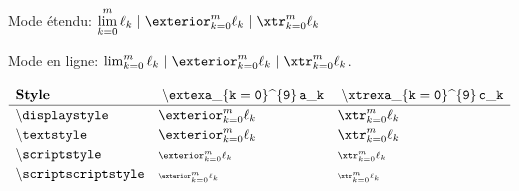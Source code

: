 \documentclass[varwidth, border = 8pt]{standalone}
\newcommand\exasep{\kern3pt | \kern3pt}
\newcommand\limexa{\lim_{k = 0}^{m} \ell_k}
\newcommand\xtrexa{\xtr_{k = 0}^{m} \ell_k}
\newcommand\extexa{\exterior_{k = 0}^{m} \ell_k}
\newcommand{\test}{\extexa}
\newcommand{\verbtest}%
           {\mathmacro{extexa}\_\{k = 0\}\text{\textasciicircum}\{9\} \, a\_k}
\newcommand{\testbis}{\xtrexa}
\newcommand{\verbtestbis}%
           {\mathmacro{xtrexa}\_\{k = 0\}\text{\textasciicircum}\{9\} \, c\_k}
\newcommand{\testmathstyle}{
    \[
        \renewcommand{\arraystretch}{1.2}%
        \begin{array}{lll}
              \textbf{Style}
            & \mathtt{\verbtest}
            & \mathtt{\verbtestbis}
            \\ \hline
              \mathtt{\backslash displaystyle}
            & \displaystyle \test
            & \displaystyle \testbis
            \\
              \mathtt{\backslash textstyle}
            & \textstyle \test
            & \textstyle \testbis
            \\
              \mathtt{\backslash scriptstyle}
            & \scriptstyle \test
            & \scriptstyle \testbis
            \\
              \mathtt{\backslash scriptscriptstyle}
            & \scriptscriptstyle \test
            & \scriptscriptstyle \testbis
        \end{array}
    \]
}
\begin{document}
Mode étendu:
$\displaystyle \limexa \exasep \extexa \exasep \xtrexa$

Mode en ligne:
$\limexa \exasep \extexa \exasep \xtrexa$.

\testmathstyle
\end{document}
